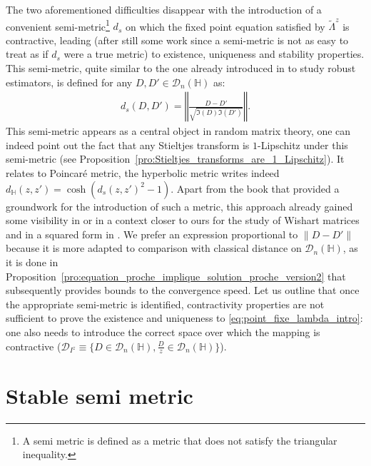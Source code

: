 \documentclass[a4papaer, titlepage]{book}
\begin{document}
The two aforementioned difficulties disappear with the introduction of a convenient semi-metric\footnote{A semi metric is defined as a metric  that does not satisfy the triangular inequality.} $d_s$ on which the fixed point equation satisfied by $\tilde \Lambda^z$ is contractive, leading (after still some work since a semi-metric is not as easy to treat as if $d_s$ were a true metric) to existence, uniqueness and stability properties. This semi-metric, quite similar to the one already introduced in \cite{louart2022concentration} to study robust estimators, is defined for any $D,D' \in \mathcal D_n(\mathbb H)$ as:
\begin{align*}
  d_s(D,D') = \left\Vert \frac{D - D'}{\sqrt{\Im(D)\Im(D')}}\right\Vert.
\end{align*}
This semi-metric appears as a central object in random matrix theory, one can indeed point out the fact that any Stieltjes transform is $1$-Lipschitz under this semi-metric (see Proposition~\ref{pro:Stieltjes_transforms_are_1_Lipschitz}). It relates to Poincaré metric, the hyperbolic metric writes indeed $d_{\mathbb H}(z,z') = \cosh(d_s(z,z')^2 - 1)$. Apart from the book \cite{earle1970fixed} that provided a groundwork for the introduction of such a metric, this approach already gained some visibility in \cite{helton2007operator,keller2013spectral} or in a context closer to ours for the study of Wishart matrices and in a squared form in \cite{AJA16}. We prefer an expression proportional to $\|D-D'\|$ because it is more adapted to comparison with classical distance on $\mathcal D_n(\mathbb H)$, as it is done in Proposition~\ref{pro:equation_proche_implique_solution_proche_version2} that subsequently provides bounds to the convergence speed. 
Let us outline that once the appropriate semi-metric is identified, contractivity properties are not sufficient to prove the existence and uniqueness to \eqref{eq:point_fixe_lambda_intro}: one also needs to introduce the correct space over which the mapping is contractive ($\mathcal D_{I^z} \equiv \{D \in \mathcal D_n(\mathbb H), \frac{D}{z} \in \mathcal D_n(\mathbb H)\}$). 



\chapter{Stable semi metric}\label{cha:stable_semi_metric}
\end{document}
